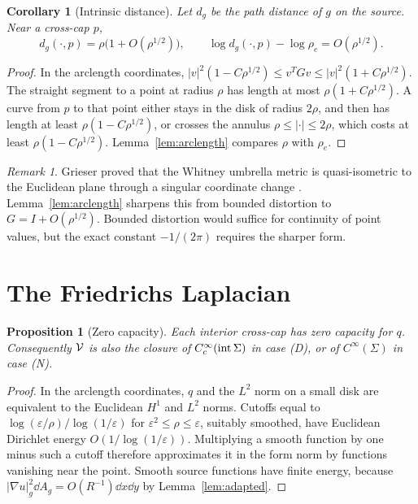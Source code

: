 \documentclass[11pt]{article}
\newtheorem{proposition}[theorem]{Proposition}
\newtheorem{corollary}[theorem]{Corollary}
\theoremstyle{definition}\newtheorem{definition}[theorem]{Definition}
\theoremstyle{remark}\newtheorem{remark}[theorem]{Remark}
\begin{document}
\begin{corollary}[Intrinsic distance]\label{cor:distance}
Let $d_g$ be the path distance of $g$ on the source. Near a cross-cap $p$,
\[
 d_g(\cdot,p)=\rho\bigl(1+O(\rho^{1/2})\bigr),\qquad
 \log d_g(\cdot,p)-\log\rho_e=O(\rho^{1/2}).
\]
\end{corollary}
\begin{proof}
In the arclength coordinates, $|v|^2(1-C\rho^{1/2})\leq v^TGv\leq|v|^2(1+C\rho^{1/2})$.
The straight segment to a point at radius $\rho$ has length at most
$\rho(1+C\rho^{1/2})$. A curve from $p$ to that point either stays in the disk
of radius $2\rho$, and then has length at least $\rho(1-C\rho^{1/2})$, or
crosses the annulus $\rho\leq|\cdot|\leq2\rho$, which costs at least
$\rho(1-C\rho^{1/2})$. Lemma~\ref{lem:arclength} compares $\rho$ with $\rho_e$.
\end{proof}

\begin{remark}
Grieser proved that the Whitney umbrella metric is quasi-isometric to the
Euclidean plane through a singular coordinate change \cite[\S1]{grieser}.
Lemma~\ref{lem:arclength} sharpens this from bounded distortion to
$G=I+O(\rho^{1/2})$. Bounded distortion would suffice for continuity of
point values, but the exact constant $-1/(2\pi)$ requires the sharper form.
\end{remark}

\section{The Friedrichs Laplacian}\label{sec:friedrichs}
\begin{proposition}[Zero capacity]\label{prop:capacity}
Each interior cross-cap has zero capacity for $q$. Consequently $\mathcal V$ is also
the closure of $C_c^\infty(\operatorname{int}\Sigma)$ in case (D), or of $C^\infty(\Sigma)$ in
case (N).
\end{proposition}
\begin{proof}
In the arclength coordinates, $q$ and the $L^2$ norm on a small disk are
equivalent to the Euclidean $H^1$ and $L^2$ norms. Cutoffs equal to
$\log(\varepsilon/\rho)/\log(1/\varepsilon)$ for $\varepsilon^2\leq\rho\leq\varepsilon$,
suitably smoothed, have Euclidean Dirichlet energy $O(1/\log(1/\varepsilon))$.
Multiplying a smooth function by one minus such a cutoff therefore
approximates it in the form norm by functions vanishing near the point. Smooth
source functions have finite energy, because $|\nabla u|_g^2\dd A_g=O(R^{-1})\dd x\dd y$
by Lemma~\ref{lem:adapted}.
\end{proof}
\end{document}
